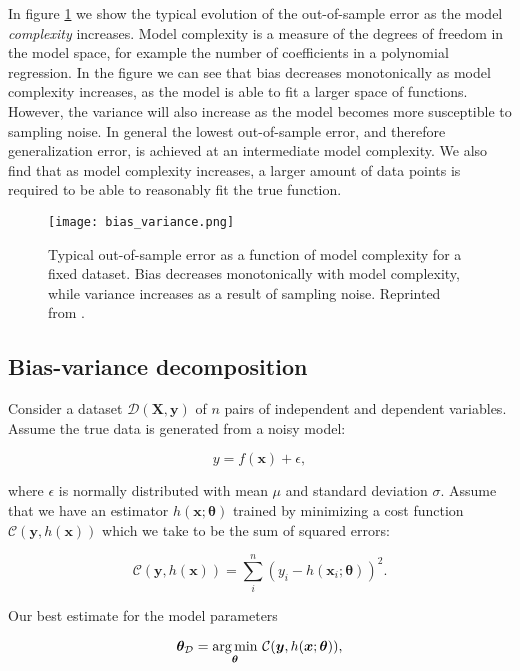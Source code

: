 In figure \ref{fig:bias-variance} we show the typical evolution
of the out-of-sample error as the model \textit{complexity} increases.
Model complexity is a measure of the degrees of freedom in the model space,
for example the number of coefficients in a polynomial regression.
In the figure we can see that bias decreases monotonically as model complexity
increases, as the model is able to fit a larger space of functions.
However, the variance will also increase as the model becomes more
susceptible to sampling noise. In general the lowest out-of-sample error,
and therefore generalization error, is achieved at an intermediate
model complexity. We also find that as model complexity increases,
a larger amount of data points is required to be able to reasonably
fit the true function.

\begin{figure}[H]
    \centering
    \texttt{[image: bias\_variance.png]}
    \caption{Typical out-of-sample error as a function
    of model complexity for a fixed dataset. Bias decreases monotonically with
    model complexity, while variance increases as a result of
    sampling noise. Reprinted from \parencite[Mehta et al. page 11]{
        mehta2019high}.}
    \label{fig:bias-variance}
\end{figure}

\subsection{Bias-variance decomposition}
Consider a dataset $\mathcal{D}(\bm{X}, \bm{y})$ of $n$ pairs
of independent and dependent variables. Assume the true data
is generated from a noisy model:

\begin{equation}
 y = f(\bm{x}) + \epsilon ,
\end{equation}

where $\epsilon$ is normally distributed with mean $\mu$ and
standard deviation $\sigma$. Assume that we have an estimator $h(\bm{x}; \bm{\theta})$
trained by minimizing a cost function $\mathcal{C}(\bm{y}, h(\bm{x}))$
which we take to be the sum of squared errors:

\begin{equation}
 \mathcal{C}(\bm{y}, h(\bm{x})) = \sum_i^n (y_i - h(\bm{x}_i; \bm{\theta}))^2 .
\end{equation}

Our best estimate for the model parameters

\begin{equation}
 \bm{\theta}_{\mathcal{D}} = \underset{\bm{\theta}}{\operatorname*{arg\,min}} \
\mathcal{C}(\bm{y}, h(\bm{x}; \bm{\theta})) ,
\end{equation}

